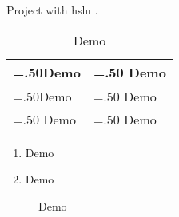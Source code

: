 Project with \gls{hslu} \autocite{hslu}.\par

\begin{table}[H]
\centering
\caption{Demo \label{tab:demo}}
\begin{tabularx}{\textwidth}{|
    >{\hsize=.50\hsize}X |
    >{\hsize=.50\hsize}X |
}
\hline
\textbf{Demo} & \textbf{Demo} \\ \hline
Demo & Demo \\ \hline
Demo & Demo \\ \hline
\end{tabularx}
\end{table}

\begin{enumerate}
\item Demo
\item Demo
\end{enumerate}

\begin{figure}[H]
    \begin{center}
    \caption{Demo}
    \label{fig:demo}
    \end{center}
\end{figure}

\newpage
